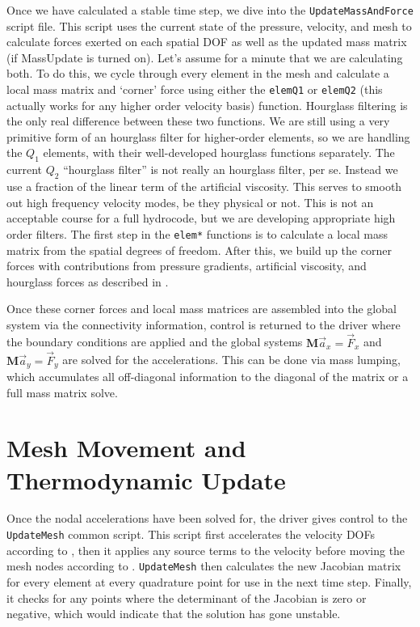 Once we have calculated a stable time step, we dive into the \texttt{UpdateMassAndForce} script file. This script uses the current state of the pressure, velocity, and mesh to calculate forces exerted on each spatial DOF as well as the updated mass matrix (if \textsf{MassUpdate} is turned on). Let's assume for a minute that we are calculating both. To do this, we cycle through every element in the mesh and calculate a local mass matrix and `corner' force using either the \texttt{elemQ1} or \texttt{elemQ2} (this actually works for any higher order velocity basis) function. Hourglass filtering is the only real difference between these two functions. We are still using a very primitive form of an hourglass filter for higher-order elements, so we are handling the $Q_1$ elements, with their well-developed hourglass functions separately. The current $Q_2$ ``hourglass filter'' is not really an hourglass filter, per se. Instead we use a fraction of the linear term of the artificial viscosity. This serves to smooth out high frequency velocity modes, be they physical or not. This is not an acceptable course for a full hydrocode, but we are developing appropriate high order filters. The first step in the \texttt{elem*} functions is to calculate a local mass matrix from the spatial degrees of freedom. After this, we build up the corner forces with contributions from pressure gradients, artificial viscosity, and hourglass forces as described in . 

Once these corner forces and local mass matrices are assembled into the global system via the connectivity information, control is returned to the driver where the boundary conditions are applied and the global systems $\mathbf{M}\vec{a}_x=\vec{F}_x$ and $\mathbf{M}\vec{a}_y=\vec{F}_y$ are solved for the accelerations. This can be done via mass lumping, which accumulates all off-diagonal information to the diagonal of the matrix or a full mass matrix solve. 

\section{Mesh Movement and Thermodynamic \mbox{Update}}
Once the nodal accelerations have been solved for, the driver gives control to the \texttt{UpdateMesh} common script. This script first accelerates the velocity DOFs according to , then it applies any source terms to the velocity before moving the mesh nodes according to .
\texttt{UpdateMesh} then calculates the new Jacobian matrix for every element at every quadrature point for use in the next time step. Finally, it checks for any points where the determinant of the Jacobian is zero or negative, which would indicate that the solution has gone unstable.

